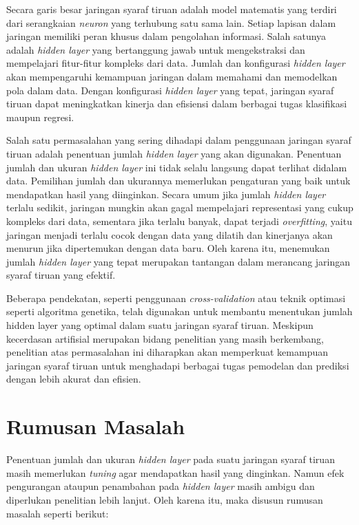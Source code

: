 Secara garis besar jaringan syaraf tiruan adalah model matematis yang terdiri dari serangkaian \textit{neuron} yang terhubung satu sama lain. Setiap lapisan dalam jaringan memiliki peran khusus dalam pengolahan informasi. Salah satunya adalah \textit{hidden layer} yang bertanggung jawab untuk mengekstraksi dan mempelajari fitur-fitur kompleks dari data. Jumlah dan konfigurasi \textit{hidden layer} akan mempengaruhi kemampuan jaringan dalam memahami dan memodelkan pola dalam data. Dengan konfigurasi \textit{hidden layer} yang tepat, jaringan syaraf tiruan dapat meningkatkan kinerja dan efisiensi dalam berbagai tugas klasifikasi maupun regresi.

Salah satu permasalahan yang sering dihadapi dalam penggunaan jaringan syaraf tiruan adalah penentuan jumlah \textit{hidden layer} yang akan digunakan. Penentuan jumlah dan ukuran \textit{hidden layer} ini tidak selalu langsung dapat terlihat didalam data. Pemilihan jumlah dan ukurannya memerlukan pengaturan yang baik untuk mendapatkan hasil yang diinginkan. Secara umum jika jumlah \textit{hidden layer} terlalu sedikit, jaringan mungkin akan gagal mempelajari representasi yang cukup kompleks dari data, sementara jika terlalu banyak, dapat terjadi \textit{overfitting}, yaitu jaringan menjadi terlalu cocok dengan data yang dilatih dan kinerjanya akan menurun jika dipertemukan dengan data baru. Oleh karena itu, menemukan jumlah \textit{hidden layer} yang tepat merupakan tantangan  dalam merancang jaringan syaraf tiruan yang efektif. 

Beberapa pendekatan, seperti penggunaan \textit{cross-validation} atau teknik optimasi seperti algoritma genetika, telah digunakan untuk membantu menentukan jumlah hidden layer yang optimal dalam suatu jaringan syaraf tiruan. Meskipun kecerdasan artifisial merupakan bidang penelitian yang masih berkembang, penelitian atas permasalahan ini diharapkan akan memperkuat kemampuan jaringan syaraf tiruan untuk menghadapi berbagai tugas pemodelan dan prediksi dengan lebih akurat dan efisien.


\section{Rumusan Masalah}

Penentuan jumlah dan ukuran \textit{hidden layer} pada suatu jaringan syaraf tiruan masih memerlukan \textit{tuning} agar mendapatkan hasil yang dinginkan. Namun efek pengurangan ataupun penambahan pada \textit{hidden layer} masih ambigu dan diperlukan penelitian lebih lanjut. Oleh karena itu, maka disusun rumusan masalah seperti berikut:

